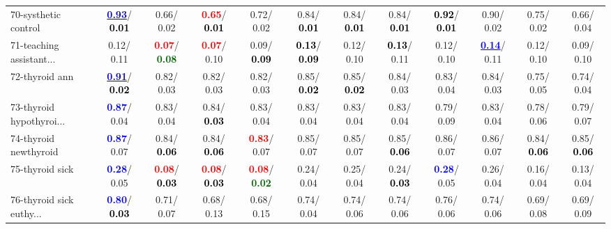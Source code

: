 \begin{table}[h]
\begin{center}
{\begin{tabular}{lc|c|c|c|c|c|c|c|c|c|c}
70-systhetic control & \underline{\textcolor{blue}{\textbf{  0.93}}}/\textcolor{black}{\textbf{  0.01}} &   0.66/  0.02 & \textcolor{red}{\textbf{  0.65}}/\textcolor{black}{\textbf{  0.01}} &   0.72/  0.02 &   0.84/\textcolor{black}{\textbf{  0.01}} &   0.84/\textcolor{black}{\textbf{  0.01}} &   0.84/\textcolor{black}{\textbf{  0.01}} & \textcolor{black}{\textbf{  0.92}}/\textcolor{black}{\textbf{  0.01}} &   0.90/  0.02 &   0.75/  0.02 &   0.66/  0.04 \\
71-teaching assistant... &   0.12/  0.11 & \textcolor{red}{\textbf{  0.07}}/\textcolor{darkgreen}{\textbf{  0.08}} & \textcolor{red}{\textbf{  0.07}}/  0.10 &   0.09/\textcolor{black}{\textbf{  0.09}} & \textcolor{black}{\textbf{  0.13}}/\textcolor{black}{\textbf{  0.09}} &   0.12/  0.10 & \textcolor{black}{\textbf{  0.13}}/  0.11 &   0.12/  0.10 & \underline{\textcolor{blue}{\textbf{  0.14}}}/  0.11 &   0.12/  0.10 &   0.09/  0.10 \\ \hline
72-thyroid ann & \underline{\textcolor{blue}{\textbf{  0.91}}}/\textcolor{black}{\textbf{  0.02}} &   0.82/  0.03 &   0.82/  0.03 &   0.82/  0.03 &   0.85/\textcolor{black}{\textbf{  0.02}} &   0.85/\textcolor{black}{\textbf{  0.02}} &   0.84/  0.03 &   0.83/  0.04 &   0.84/  0.03 &   0.75/  0.05 &   0.74/  0.04 \\
73-thyroid hypothyroi... & \textcolor{blue}{\textbf{  0.87}}/  0.04 &   0.83/  0.04 &   0.84/\textcolor{black}{\textbf{  0.03}} &   0.83/  0.04 &   0.83/  0.04 &   0.83/  0.04 &   0.83/  0.04 &   0.79/  0.09 &   0.83/  0.04 &   0.78/  0.06 &   0.79/  0.07 \\
74-thyroid newthyroid & \textcolor{blue}{\textbf{  0.87}}/  0.07 &   0.84/\textcolor{black}{\textbf{  0.06}} &   0.84/\textcolor{black}{\textbf{  0.06}} & \textcolor{red}{\textbf{  0.83}}/  0.07 &   0.85/  0.07 &   0.85/  0.07 &   0.85/\textcolor{black}{\textbf{  0.06}} &   0.86/  0.07 &   0.86/  0.07 &   0.84/\textcolor{black}{\textbf{  0.06}} &   0.85/\textcolor{black}{\textbf{  0.06}} \\
75-thyroid sick & \textcolor{blue}{\textbf{  0.28}}/  0.05 & \textcolor{red}{\textbf{  0.08}}/\textcolor{black}{\textbf{  0.03}} & \textcolor{red}{\textbf{  0.08}}/\textcolor{black}{\textbf{  0.03}} & \textcolor{red}{\textbf{  0.08}}/\textcolor{darkgreen}{\textbf{  0.02}} &   0.24/  0.04 &   0.25/  0.04 &   0.24/\textcolor{black}{\textbf{  0.03}} & \textcolor{blue}{\textbf{  0.28}}/  0.05 &   0.26/  0.04 &   0.16/  0.04 &   0.13/  0.04 \\
76-thyroid sick euthy... & \textcolor{blue}{\textbf{  0.80}}/\textcolor{black}{\textbf{  0.03}} &   0.71/  0.07 &   0.68/  0.13 &   0.68/  0.15 &   0.74/  0.04 &   0.74/  0.06 &   0.74/  0.06 &   0.76/  0.06 &   0.74/  0.06 &   0.69/  0.08 &   0.69/  0.09 \\

\end{tabular}}
\end{center}
\end{table}

